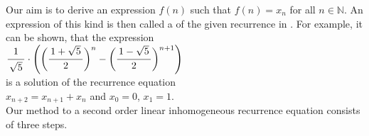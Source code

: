 \noindent
Our aim is to derive an expression $f(n)$ such that $f(n) = x_n$ for all $n\in\mathbb{N}$.  An expression of
this kind is then called a  of the given recurrence in .  For example, it can
be shown, that the expression
\\[0.2cm]
\hspace*{1.3cm}
$\ds \bruch{1}{\sqrt{5}} \cdot \left(\biggl(\bruch{1+\sqrt{5}}{2}\biggr)^{n} - \biggl(\bruch{1-\sqrt{5}}{2}\biggr)^{n+1}\right)$ \quad
\\[0.2cm]
is a solution of the recurrence equation 
\\[0.2cm]
\hspace*{1.3cm}
$x_{n+2} = x_{n+1} + x_n$ \quad and \quad $x_0 = 0$, $x_1 = 1$.
\\[0.2cm]
Our method to  a second order linear inhomogeneous recurrence equation consists of three steps.
